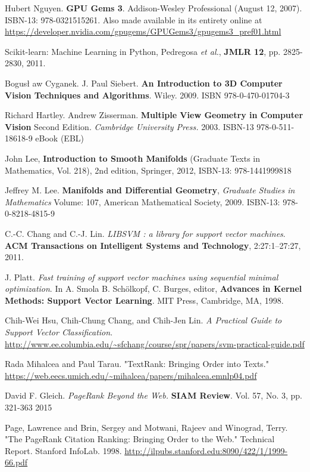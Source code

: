 \documentclass[10pt]{amsart}
\begin{document}
\begin{thebibliography}{9}
Hubert Nguyen. \textbf{GPU Gems 3}.  Addison-Wesley Professional (August 12, 2007).  ISBN-13: 978-0321515261.  Also made available in its entirety online at \url{https://developer.nvidia.com/gpugems/GPUGems3/gpugems3_pref01.html}

  Scikit-learn: Machine Learning in Python, Pedregosa \emph{et al.}, \textbf{JMLR 12}, pp. 2825-2830, 2011.


Bogus\l{} aw Cyganek.  J. Paul Siebert.  \textbf{An Introduction to 3D Computer Vision Techniques and Algorithms}.  Wiley.  2009.  ISBN 978-0-470-01704-3

Richard Hartley.  Andrew Zisserman.  \textbf{Multiple View Geometry in Computer Vision}  Second Edition.  \emph{Cambridge University Press.}  2003.  ISBN-13 978-0-511-18618-9 eBook (EBL)

John Lee, \textbf{Introduction to Smooth Manifolds} (Graduate Texts in Mathematics, Vol. 218), 2nd edition, Springer,  2012, ISBN-13: 978-1441999818

Jeffrey M. Lee. \textbf{Manifolds and Differential Geometry}, \emph{Graduate Studies in Mathematics} Volume: 107, American Mathematical Society, 2009. ISBN-13: 978-0-8218-4815-9



  C.-C. Chang and C.-J. Lin. \emph{LIBSVM : a library for support vector machines}. \textbf{ACM Transactions on Intelligent Systems and Technology}, 2:27:1--27:27, 2011. 

  J. Platt. \emph{Fast training of support vector machines using sequential minimal optimization}. In A. Smola B. Schölkopf, C. Burges, editor, \textbf{Advances in Kernel Methods: Support Vector Learning}. MIT Press, Cambridge, MA, 1998.

Chih-Wei Hsu, Chih-Chung Chang, and Chih-Jen Lin.  \emph{A Practical Guide to Support Vector Classification}.  \url{http://www.ee.columbia.edu/~sfchang/course/spr/papers/svm-practical-guide.pdf}

Rada Mihalcea and Paul Tarau.  "TextRank: Bringing Order into Texts."  
\url{https://web.eecs.umich.edu/~mihalcea/papers/mihalcea.emnlp04.pdf}  

David F. Gleich.  \emph{PageRank Beyond the Web.}  \textbf{SIAM Review}.  Vol. 57, No. 3, pp. 321-363 2015  
  
Page, Lawrence and Brin, Sergey and Motwani, Rajeev and Winograd, Terry.  "The PageRank Citation Ranking: Bringing Order to the Web." Technical Report. Stanford InfoLab.  1998.  \url{http://ilpubs.stanford.edu:8090/422/1/1999-66.pdf}  
  

\end{thebibliography}
\end{document}
